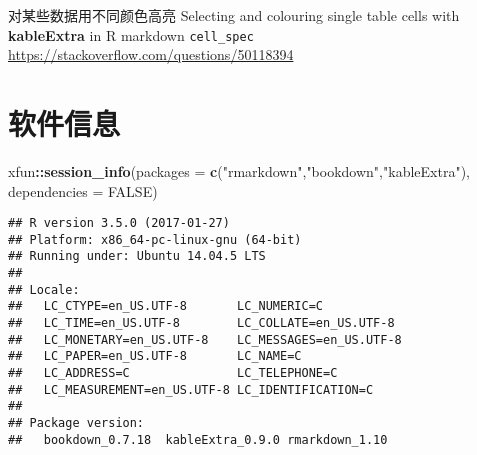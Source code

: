 \documentclass[]{book}
\newenvironment{Shaded}{\begin{snugshade}}{\end{snugshade}}
\newcommand{\DataTypeTok}[1]{\textcolor[rgb]{0.13,0.29,0.53}{#1}}
\newcommand{\KeywordTok}[1]{\textcolor[rgb]{0.13,0.29,0.53}{\textbf{#1}}}
\newcommand{\NormalTok}[1]{#1}
\newcommand{\OperatorTok}[1]{\textcolor[rgb]{0.81,0.36,0.00}{\textbf{#1}}}
\newcommand{\OtherTok}[1]{\textcolor[rgb]{0.56,0.35,0.01}{#1}}
\newcommand{\StringTok}[1]{\textcolor[rgb]{0.31,0.60,0.02}{#1}}
\begin{document}
对某些数据用不同颜色高亮 Selecting and colouring single table cells with
\textbf{kableExtra} in R markdown \texttt{cell\_spec}
\url{https://stackoverflow.com/questions/50118394}

\section{软件信息}

\begin{Shaded}
\begin{Highlighting}[]
\NormalTok{xfun}\OperatorTok{::}\KeywordTok{session_info}\NormalTok{(}\DataTypeTok{packages =} \KeywordTok{c}\NormalTok{(}\StringTok{"rmarkdown"}\NormalTok{,}\StringTok{"bookdown"}\NormalTok{,}\StringTok{"kableExtra"}\NormalTok{),}
                   \DataTypeTok{dependencies =} \OtherTok{FALSE}\NormalTok{)}
\end{Highlighting}
\end{Shaded}

\begin{verbatim}
## R version 3.5.0 (2017-01-27)
## Platform: x86_64-pc-linux-gnu (64-bit)
## Running under: Ubuntu 14.04.5 LTS
## 
## Locale:
##   LC_CTYPE=en_US.UTF-8       LC_NUMERIC=C              
##   LC_TIME=en_US.UTF-8        LC_COLLATE=en_US.UTF-8    
##   LC_MONETARY=en_US.UTF-8    LC_MESSAGES=en_US.UTF-8   
##   LC_PAPER=en_US.UTF-8       LC_NAME=C                 
##   LC_ADDRESS=C               LC_TELEPHONE=C            
##   LC_MEASUREMENT=en_US.UTF-8 LC_IDENTIFICATION=C       
## 
## Package version:
##   bookdown_0.7.18  kableExtra_0.9.0 rmarkdown_1.10
\end{verbatim}


\end{document}
